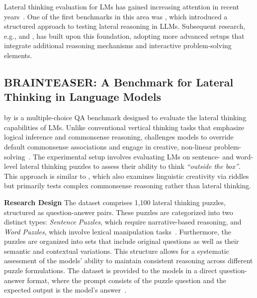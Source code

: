 Lateral thinking evaluation for \acp{LM} has gained increasing attention in recent years~\cite{jiangBRAINTEASERLateralThinking2023, huangLatEvalInteractiveLLMs2024, chenWeakevalStrongEvaluatingEliciting2024}. One of the first benchmarks in this area was , which introduced a structured approach to testing lateral reasoning in \acp{LLM}. Subsequent research, e.g.,  and , has built upon this foundation, adopting more advanced setups that integrate additional reasoning mechanisms and interactive problem-solving elements.

\subsection{BRAINTEASER: A Benchmark for Lateral Thinking in Language Models}

 by \textcite{jiangBRAINTEASERLateralThinking2023} is a multiple-choice \ac{QA} benchmark designed to evaluate the lateral thinking capabilities of \acp{LM}. Unlike conventional vertical thinking tasks that emphasize logical inference and commonsense reasoning,  challenges models to override default commonsense associations and engage in creative, non-linear problem-solving~\cite{jiangBRAINTEASERLateralThinking2023}. The experimental setup involves evaluating \acp{LM} on sentence- and word-level lateral thinking puzzles to assess their ability to think \textit{``outside the box''}. This approach is similar to , which also examines linguistic creativity via riddles but primarily tests complex commonsense reasoning rather than lateral thinking.

\textbf{Research Design}
The dataset comprises 1,100 lateral thinking puzzles, structured as question-answer pairs. These puzzles are categorized into two distinct types: \textit{Sentence Puzzles}, which require narrative-based reasoning, and \textit{Word Puzzles}, which involve lexical manipulation tasks~\cite{jiangBRAINTEASERLateralThinking2023}. Furthermore, the puzzles are organized into sets that include original questions as well as their semantic and contextual variations. This structure allows for a systematic assessment of the models' ability to maintain consistent reasoning across different puzzle formulations. The dataset is provided to the models in a direct question-answer format, where the prompt consists of the puzzle question and the expected output is the model's answer~\cite{jiangBRAINTEASERLateralThinking2023}.

